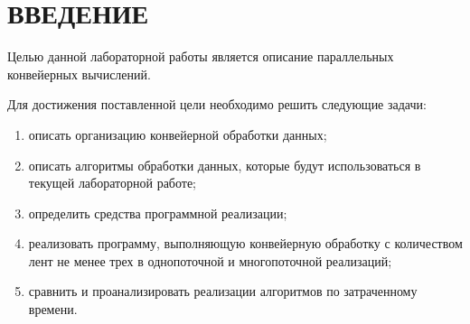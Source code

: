 \chapter*{ВВЕДЕНИЕ}

Целью данной лабораторной работы является описание параллельных конвейерных вычислений.

Для достижения поставленной цели необходимо решить следующие задачи:
\begin{enumerate}[label={\arabic*)}]
    \item описать организацию конвейерной обработки данных;
    \item описать алгоритмы обработки данных, которые будут использоваться в текущей лабораторной работе;
    \item определить средства программной реализации;
    \item реализовать программу, выполняющую конвейерную обработку с количеством лент не менее трех в однопоточной и многопоточной реализаций;
    \item сравнить и проанализировать реализации алгоритмов по затраченному времени.
\end{enumerate}